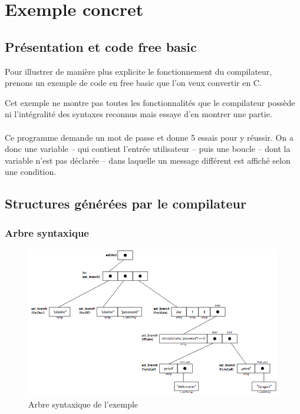 \documentclass{article}
\begin{document}
\section{Exemple concret}
\subsection{Présentation et code free basic}
Pour illustrer de manière plus explicite le fonctionnement du compilateur, prenons un 
exemple de code en free basic que l'on veux convertir en C.

\lstset{language=c,caption=Exemple en free basic}


Cet exemple ne montre pas toutes les fonctionnalités que le compilateur possède ni 
l'intégralité des syntaxes reconnus mais essaye d'en montrer une partie.
\\\\
Ce programme demande un mot de passe et donne 5 essais pour y réussir. On a donc une 
variable -- qui contient l'entrée utilisateur -- puis une boucle -- dont la variable 
n'est pas déclarée -- dans laquelle un message différent est affiché selon une condition.

\subsection{Structures générées par le compilateur}
\subsubsection*{Arbre syntaxique}
\begin{landscape}
	\begin{figure}[h]
    		\centering
    		\includegraphics[scale=0.65]{resources/exemple_arbre.png}
    		\caption{Arbre syntaxique de l'exemple}
	\end{figure}
\end{landscape}
\end{document}
